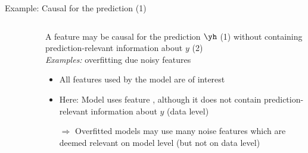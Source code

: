 \documentclass[11pt,compress,t,notes=noshow, aspectratio=169, xcolor=table]{beamer}
\begin{document}
\begin{frame}[c]{Example: Causal for the prediction (1)}
\begin{columns}[c]
\begin{column}{0.6\textwidth}
\begin{figure}
\end{figure} 
  \end{column}
  \begin{column}{0.4\textwidth}
  A feature may be causal for the prediction $\yh$ (1) without containing prediction-relevant information about $y$ (2)\\ 
  \textit{Examples:} overfitting due noisy features
  \pause
    \begin{itemize}
      \item All features used by the model are of interest
      \item Here: Model uses feature , although it does not contain prediction-relevant information about $y$ (data level)
      \item[$\Rightarrow$] Overfitted models may use many noise features which are deemed relevant on model level (but not on data level)
  \end{itemize}
  \end{column}
\end{columns}

\end{frame}
\end{document}
